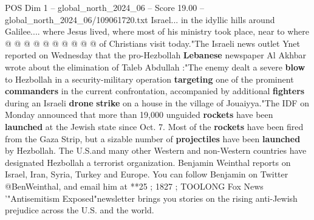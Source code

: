 \begin{textsample}{POS Dim 1 – global\_north\_2024\_06 – Score 19.00 – global\_north\_2024\_06/109061720.txt}
Israel... in the idyllic hills around Galilee.... where Jesus lived, where most of his ministry took place, near to where @ @ @ @ @ @ @ @ @ @ of Christians visit today."The Israeli news outlet Ynet reported on Wednesday that the pro-Hezbollah \textbf{Lebanese} newspaper Al Akhbar wrote about the elimination of Taleb Abdullah :"The enemy dealt a severe \textbf{blow} to Hezbollah in a security-military operation \textbf{targeting} one of the prominent \textbf{commanders} in the current confrontation, accompanied by additional \textbf{fighters} during an Israeli \textbf{drone} \textbf{strike} on a house in the village of Jouaiyya."The IDF on Monday announced that more than 19,000 unguided \textbf{rockets} have been \textbf{launched} at the Jewish state since Oct. 7.
Most of the \textbf{rockets} have been fired from the Gaza Strip, but a sizable number of \textbf{projectiles} have been \textbf{launched} by Hezbollah.
The U.S.and many other Western and non-Western countries have designated Hezbollah a terrorist organization.
Benjamin Weinthal reports on Israel, Iran, Syria, Turkey and Europe.
You can follow Benjamin on Twitter @BenWeinthal, and email him at **25 ; 1827 ; TOOLONG Fox News '"Antisemitism Exposed"newsletter brings you stories on the rising anti-Jewish prejudice across the U.S. and the world.

\end{textsample}

